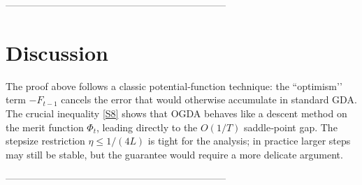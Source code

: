 \documentclass[11pt]{article}
\begin{document}
--------------------------------------------------------------------

\section*{Discussion}
The proof above follows a classic potential‑function technique: the ``optimism’’ term $-F_{t-1}$ cancels the error that would otherwise accumulate in standard GDA. The crucial inequality \eqref{S8} shows that OGDA behaves like a descent method on the merit function $\Phi_t$, leading directly to the $O(1/T)$ saddle‑point gap. The stepsize restriction $\eta\le 1/(4L)$ is tight for the analysis; in practice larger steps may still be stable, but the guarantee would require a more delicate argument.

--------------------------------------------------------------------
\end{document}
